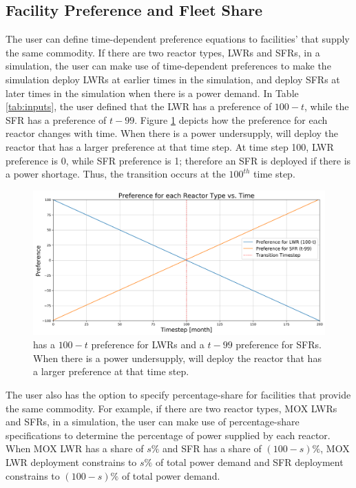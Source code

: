 \subsection{Facility Preference and Fleet Share}
\label{sec:pref}
The user can define time-dependent preference equations to facilities'  
that supply the same commodity. 
If there are two reactor types, \glspl{LWR} and \glspl{SFR}, in a simulation, 
the user can make use of time-dependent 
preferences to make the simulation deploy LWRs at earlier times 
in the simulation, and deploy SFRs at later times in the 
simulation when there is a power demand. 
In Table \ref{tab:inputs}, 
the user defined that the LWR has a preference of $100-t$, while 
the SFR has a preference of $t-99$. 
Figure \ref{fig:prefplot} depicts how the preference for each reactor changes 
with time. 
When there is a power undersupply, \deploy will deploy the reactor that has a
larger preference at that time step.
At time step 100, LWR preference is 0, while SFR preference is 1; 
therefore an SFR is deployed if there is a power shortage. 
Thus, the transition occurs at the $100^{th}$ time step.

\begin{figure}[]
	\begin{center}
		\includegraphics[width=\linewidth]{./figures/prefplot}
	\end{center}	
		\caption{\deploy has a $100-t$ preference for LWRs and a $t-99$ preference for SFRs.
		When there is a power undersupply, \deploy will deploy the reactor that has a
		larger preference at that time step.}
	\label{fig:prefplot}
\end{figure}

The user also has the option to specify percentage-share for facilities 
that provide the same commodity. 
For example, if there are two reactor types, \gls{MOX} LWRs and SFRs, in a simulation,
the user can make use of percentage-share specifications to determine the 
percentage of power supplied by each reactor.   
When MOX LWR has a share of $s\%$ and 
\gls{SFR} has a share of $(100-s)\%$, 
MOX LWR deployment constrains to $s\%$ of total power demand 
and SFR deployment constrains to $(100-s)\%$ of total power demand.  


